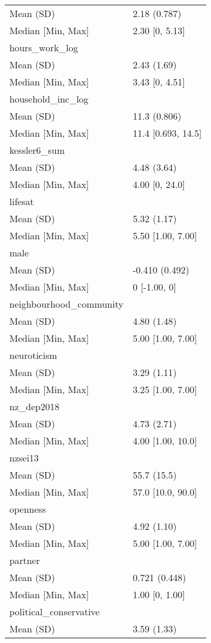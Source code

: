 \documentclass[
  singlecolumn,
  9pt]{article}
\begin{document}
\begin{longtable}[]{@{}ll@{}}
Mean (SD) & 2.18 (0.787) \\
Median {[}Min, Max{]} & 2.30 {[}0, 5.13{]} \\
hours\_work\_log & \\
Mean (SD) & 2.43 (1.69) \\
Median {[}Min, Max{]} & 3.43 {[}0, 4.51{]} \\
household\_inc\_log & \\
Mean (SD) & 11.3 (0.806) \\
Median {[}Min, Max{]} & 11.4 {[}0.693, 14.5{]} \\
kessler6\_sum & \\
Mean (SD) & 4.48 (3.64) \\
Median {[}Min, Max{]} & 4.00 {[}0, 24.0{]} \\
lifesat & \\
Mean (SD) & 5.32 (1.17) \\
Median {[}Min, Max{]} & 5.50 {[}1.00, 7.00{]} \\
male & \\
Mean (SD) & -0.410 (0.492) \\
Median {[}Min, Max{]} & 0 {[}-1.00, 0{]} \\
neighbourhood\_community & \\
Mean (SD) & 4.80 (1.48) \\
Median {[}Min, Max{]} & 5.00 {[}1.00, 7.00{]} \\
neuroticism & \\
Mean (SD) & 3.29 (1.11) \\
Median {[}Min, Max{]} & 3.25 {[}1.00, 7.00{]} \\
nz\_dep2018 & \\
Mean (SD) & 4.73 (2.71) \\
Median {[}Min, Max{]} & 4.00 {[}1.00, 10.0{]} \\
nzsei13 & \\
Mean (SD) & 55.7 (15.5) \\
Median {[}Min, Max{]} & 57.0 {[}10.0, 90.0{]} \\
openness & \\
Mean (SD) & 4.92 (1.10) \\
Median {[}Min, Max{]} & 5.00 {[}1.00, 7.00{]} \\
partner & \\
Mean (SD) & 0.721 (0.448) \\
Median {[}Min, Max{]} & 1.00 {[}0, 1.00{]} \\
political\_conservative & \\
Mean (SD) & 3.59 (1.33) \\

\end{longtable}
\end{document}
